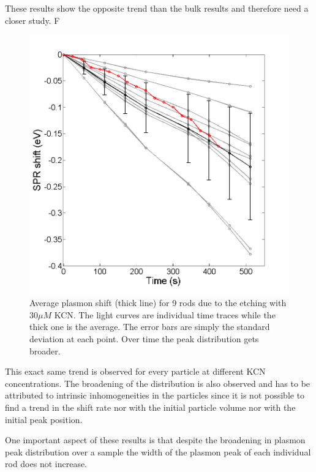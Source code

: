 \documentclass[twocolumn]{article}
\begin{document}
These results show the opposite trend than the bulk results and therefore need a
closer study. F

\begin{figure}[tp]
 \centering
 \includegraphics[width=0.95\linewidth]{plasmon_average.png}
 \caption{Average plasmon shift (thick line) for 9 rods due to the etching with
 $30\mu M$ KCN. The light curves are individual time traces while the thick one
 is the average. The error bars are simply the standard deviation at each point. Over
 time the peak distribution gets broader.}
 \label{fig:plasmon_average}
\end{figure}

This exact same trend is observed for every particle at different KCN
concentrations. The broadening of the distribution is also observed and has to
be attributed to intrinsic inhomogeneities in the particles since it is not
possible to find a trend in the shift rate nor with the initial particle 
volume nor with the initial peak position. 

One important aspect of these results is that despite the broadening in plasmon
peak distribution over a sample the width of the plasmon peak of each individual
rod does not increase. 
\end{document}
